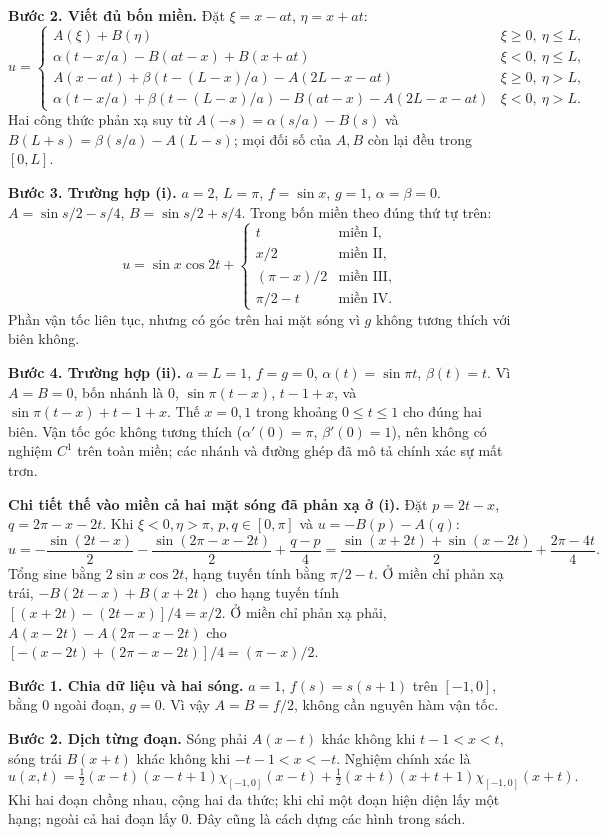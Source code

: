 \textbf{Bước 2. Viết đủ bốn miền.} Đặt $\xi=x-at$, $\eta=x+at$:
\[u=\begin{cases}
A(\xi)+B(\eta)&\xi\ge0,\ \eta\le L,\\
\alpha(t-x/a)-B(at-x)+B(x+at)&\xi<0,\ \eta\le L,\\
A(x-at)+\beta(t-(L-x)/a)-A(2L-x-at)&\xi\ge0,\ \eta>L,\\
\alpha(t-x/a)+\beta(t-(L-x)/a)-B(at-x)-A(2L-x-at)&\xi<0,\ \eta>L.
\end{cases}\]
Hai công thức phản xạ suy từ $A(-s)=\alpha(s/a)-B(s)$ và $B(L+s)=\beta(s/a)-A(L-s)$; mọi đối số của $A,B$ còn lại đều trong $[0,L]$.

\textbf{Bước 3. Trường hợp (i).} $a=2$, $L=\pi$, $f=\sin x$, $g=1$, $\alpha=\beta=0$. $A=\sin s/2-s/4$, $B=\sin s/2+s/4$. Trong bốn miền theo đúng thứ tự trên:
\[u=\sin x\cos2t+\begin{cases}t&\text{miền I},\\x/2&\text{miền II},\\(\pi-x)/2&\text{miền III},\\\pi/2-t&\text{miền IV}.\end{cases}\]
Phần vận tốc liên tục, nhưng có góc trên hai mặt sóng vì $g$ không tương thích với biên không.

\textbf{Bước 4. Trường hợp (ii).} $a=L=1$, $f=g=0$, $\alpha(t)=\sin\pi t$, $\beta(t)=t$. Vì $A=B=0$, bốn nhánh là $0$, $\sin\pi(t-x)$, $t-1+x$, và $\sin\pi(t-x)+t-1+x$. Thế $x=0,1$ trong khoảng $0\le t\le1$ cho đúng hai biên. Vận tốc góc không tương thích ($\alpha'(0)=\pi$, $\beta'(0)=1$), nên không có nghiệm $C^1$ trên toàn miền; các nhánh và đường ghép đã mô tả chính xác sự mất trơn.

\textbf{Chi tiết thế vào miền cả hai mặt sóng đã phản xạ ở (i).} Đặt $p=2t-x$, $q=2\pi-x-2t$. Khi $\xi<0,\eta>\pi$, $p,q\in[0,\pi]$ và $u=-B(p)-A(q)$:
\[u=-\frac{\sin(2t-x)}2-\frac{\sin(2\pi-x-2t)}2+\frac{q-p}{4}
=\frac{\sin(x+2t)+\sin(x-2t)}2+\frac{2\pi-4t}{4}.\]
Tổng sine bằng $2\sin x\cos2t$, hạng tuyến tính bằng $\pi/2-t$. Ở miền chỉ phản xạ trái, $-B(2t-x)+B(x+2t)$ cho hạng tuyến tính $[(x+2t)-(2t-x)]/4=x/2$. Ở miền chỉ phản xạ phải, $A(x-2t)-A(2\pi-x-2t)$ cho $[-(x-2t)+(2\pi-x-2t)]/4=(\pi-x)/2$.

\textbf{Bước 1. Chia dữ liệu và hai sóng.} $a=1$, $f(s)=s(s+1)$ trên $[-1,0]$, bằng $0$ ngoài đoạn, $g=0$. Vì vậy $A=B=f/2$, không cần nguyên hàm vận tốc.

\textbf{Bước 2. Dịch từng đoạn.} Sóng phải $A(x-t)$ khác không khi $t-1<x<t$, sóng trái $B(x+t)$ khác không khi $-t-1<x<-t$. Nghiệm chính xác là
\[u(x,t)=\tfrac12(x-t)(x-t+1)\chi_{[-1,0]}(x-t)+\tfrac12(x+t)(x+t+1)\chi_{[-1,0]}(x+t).\]
Khi hai đoạn chồng nhau, cộng hai đa thức; khi chỉ một đoạn hiện diện lấy một hạng; ngoài cả hai đoạn lấy $0$. Đây cũng là cách dựng các hình trong sách.


